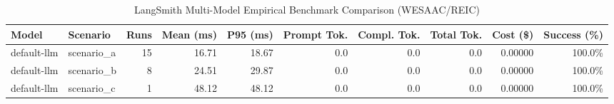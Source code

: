 \begin{table}[htbp]
\centering
\caption{LangSmith Multi-Model Empirical Benchmark Comparison (WESAAC/REIC)}
\label{tab:langsmith_metrics_comparison}
\begin{tabular}{llrrrrrrrr}
\toprule
\textbf{Model} & \textbf{Scenario} & \textbf{Runs} & \textbf{Mean (ms)} & \textbf{P95 (ms)} & \textbf{Prompt Tok.} & \textbf{Compl. Tok.} & \textbf{Total Tok.} & \textbf{Cost (\$)} & \textbf{Success (\%)} \\
\midrule
default-llm & scenario\_a & 15 & 16.71 & 18.67 & 0.0 & 0.0 & 0.0 & 0.00000 & 100.0\% \\
default-llm & scenario\_b & 8 & 24.51 & 29.87 & 0.0 & 0.0 & 0.0 & 0.00000 & 100.0\% \\
default-llm & scenario\_c & 1 & 48.12 & 48.12 & 0.0 & 0.0 & 0.0 & 0.00000 & 100.0\% \\
\bottomrule
\end{tabular}
\end{table}

